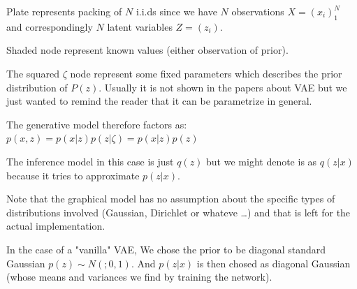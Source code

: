 \documentclass[11pt, a4paper]{report}
\theoremstyle{plain}
\theoremstyle{definition}
\theoremstyle{remark}
\begin{document}
Plate represents packing of $N$ i.i.ds since we have $N$ observations $X =
(x_i)_1^N$ and correspondingly $N$ latent variables $Z = (z_i)$.

Shaded node represent known values (either observation of prior).

The squared $\zeta$ node represent some fixed parameters which describes the
prior distribution of $P(z)$. Usually it is not shown in the papers about VAE
but we just wanted to remind the reader that it can be parametrize in general.

The generative model therefore factors as: $p(x,z) = p(x|z)p(z|\zeta) =
p(x|z)p(z)$

The inference model in this case is just $q(z)$ but we might denote is as
$q(z|x)$ because it tries to approximate $p(z|x)$.

Note that the graphical model has no assumption about the specific types of
distributions involved (Gaussian, Dirichlet or whateve \dots) and that is left
for the actual implementation.

In the case of a "vanilla" VAE, We chose the prior to be diagonal standard Gaussian
$p(z) \sim N(;0,1)$. And $p(z | x)$ is then chosed as diagonal Gaussian (whose
means and variances we find by training the network).
\end{document}
